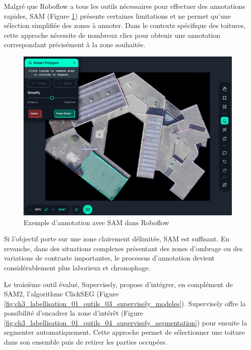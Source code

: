 Malgré que Roboflow a tous les outils nécessaires pour effectuer des annotations rapides, SAM (Figure \ref{fig:ch3_labellisation_01_outils_02_robolfow_sam}) présente certaines limitations et ne permet qu'une sélection simplifiée des zones à annoter. Dans le contexte spécifique des toitures, cette approche nécessite de nombreux clics pour obtenir une annotation correspondant précisément à la zone souhaitée. 

\begin{figure}[H]
    \centering
    \includegraphics[width=1\linewidth]{02-main/figures/ch3/ch3_labellisation_01_outils_02_robolfow_sam.png}
    \caption{Exemple d'annotation avec SAM dans Roboflow}
    \label{fig:ch3_labellisation_01_outils_02_robolfow_sam}
\end{figure}

Si l'objectif porte sur une zone clairement délimitée, SAM est suffisant. En revanche, dans des situations complexes présentant des zones d'ombrage ou des variations de contraste importantes, le processus d'annotation devient considérablement plus laborieux et chronophage.

Le troisième outil évalué, Supervisely, propose d'intégrer, en complément de SAM2, l'algorithme ClickSEG \cite{chen_conditional_2021} \cite{chen_focalclick_2022} (Figure \ref{fig:ch3_labellisation_01_outils_03_supervisely_modeles}). Supervisely offre la possibilité d'encadrer la zone d'intérêt (Figure \ref{fig:ch3_labellisation_01_outils_04_supervisely_segmentation}) pour ensuite la segmenter automatiquement. Cette approche permet de sélectionner une toiture dans son ensemble puis de retirer les parties occupées.

